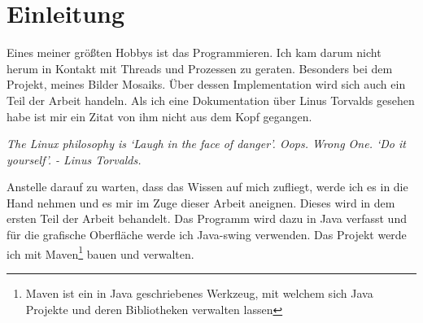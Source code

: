 \section{Einleitung}
Eines meiner größten Hobbys ist das Programmieren. Ich kam darum nicht herum in Kontakt mit Threads und Prozessen zu geraten. Besonders bei dem Projekt, meines Bilder Mosaiks. Über dessen Implementation wird sich auch ein Teil der Arbeit handeln. Als ich eine Dokumentation über Linus Torvalds gesehen habe ist mir ein Zitat von ihm nicht aus dem Kopf gegangen.\\
\begin{center}
    \textit{The Linux philosophy is ‘Laugh in the face of danger’. Oops. Wrong One. ‘Do it yourself’. - Linus Torvalds.}
\end{center}
Anstelle darauf zu warten, dass das Wissen auf mich zufliegt, werde ich es in die Hand nehmen und es mir im Zuge dieser Arbeit aneignen. Dieses wird in dem ersten Teil der Arbeit behandelt. Das Programm wird dazu in Java verfasst und für die grafische Oberfläche werde ich Java-swing verwenden. Das Projekt werde ich mit Maven\footnote{Maven ist ein in Java geschriebenes Werkzeug, mit welchem sich Java Projekte und deren Bibliotheken verwalten lassen} bauen und verwalten.